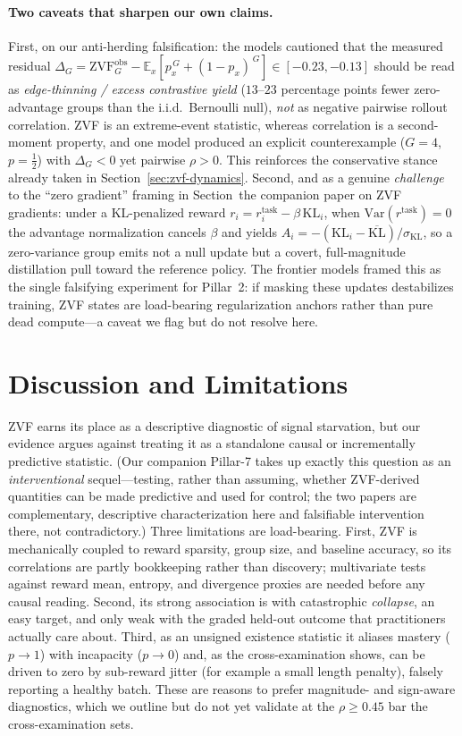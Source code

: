 \documentclass{article}
\begin{document}
\paragraph{Two caveats that sharpen our own claims.}
First, on our anti-herding falsification: the models cautioned that the
measured residual
$\Delta_G=\mathrm{ZVF}^{\mathrm{obs}}_G-\mathbb{E}_x[p_x^{\,G}+(1-p_x)^{\,G}]\in[-0.23,-0.13]$
should be read as \emph{edge-thinning / excess contrastive yield}
($13$--$23$ percentage points fewer zero-advantage groups than the
i.i.d.\ Bernoulli null), \emph{not} as negative pairwise rollout
correlation. ZVF is an extreme-event statistic, whereas correlation is a
second-moment property, and one model produced an explicit counterexample
($G=4$, $p=\tfrac12$) with $\Delta_G<0$ yet pairwise $\rho>0$. This
reinforces the conservative stance already taken in
Section~\ref{sec:zvf-dynamics}. Second, and as a genuine \emph{challenge}
to the ``zero gradient'' framing in Section~the companion paper on ZVF gradients: under
a KL-penalized reward $r_i=r^{\mathrm{task}}_i-\beta\,\mathrm{KL}_i$, when
$\mathrm{Var}(r^{\mathrm{task}})=0$ the advantage normalization cancels
$\beta$ and yields
$A_i=-(\mathrm{KL}_i-\overline{\mathrm{KL}})/\sigma_{\mathrm{KL}}$, so a
zero-variance group emits not a null update but a covert, full-magnitude
distillation pull toward the reference policy. The frontier models framed
this as the single falsifying experiment for Pillar~2: if masking these
updates destabilizes training, ZVF states are load-bearing regularization
anchors rather than pure dead compute---a caveat we flag but do not
resolve here.
 \section{Discussion and Limitations}
\label{sec:p2-discussion}
ZVF earns its place as a descriptive diagnostic of signal starvation, but our
evidence argues against treating it as a standalone causal or incrementally
predictive statistic. (Our companion Pillar-7 takes up exactly this question as an
\emph{interventional} sequel---testing, rather than assuming, whether ZVF-derived
quantities can be made predictive and used for control; the two papers are
complementary, descriptive characterization here and falsifiable intervention there,
not contradictory.) Three limitations are load-bearing. First, ZVF is
mechanically coupled to reward sparsity, group size, and baseline accuracy, so its
correlations are partly bookkeeping rather than discovery; multivariate tests
against reward mean, entropy, and divergence proxies are needed before any causal
reading. Second, its strong association is with catastrophic \emph{collapse}, an
easy target, and only weak with the graded held-out outcome that practitioners
actually care about. Third, as an unsigned existence statistic it aliases mastery
($p \to 1$) with incapacity ($p \to 0$) and, as the cross-examination shows, can be
driven to zero by sub-reward jitter (for example a small length penalty), falsely
reporting a healthy batch. These are reasons to prefer magnitude- and sign-aware
diagnostics, which we outline but do not yet validate at the $\rho \geq 0.45$ bar
the cross-examination sets.
\end{document}

